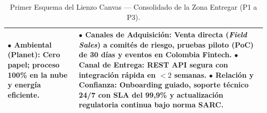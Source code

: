 \documentclass[11pt,a4paper]{article}
\begin{document}
\begin{table}[htbp]
\begin{tabularx}{\textwidth}{|X|X|}
$\bullet$ \textbf{Ambiental (Planet):} Cero papel; proceso 100\% en la nube y energ\'ia eficiente. & 
$\bullet$ \textbf{Canales de Adquisici\'on:} Venta directa (\textit{Field Sales}) a comit\'es de riesgo, pruebas piloto (PoC) de 30 d\'ias y eventos en Colombia Fintech. \newline
$\bullet$ \textbf{Canal de Entrega:} REST API segura con integraci\'on r\'apida en $<2$ semanas. \newline
$\bullet$ \textbf{Relaci\'on y Confianza:} Onboarding guiado, soporte t\'ecnico 24/7 con SLA del 99,9\% y actualizaci\'on regulatoria continua bajo norma SARC. \\
\hline
\end{tabularx}
\caption{Primer Esquema del Lienzo Canvas --- Consolidado de la Zona Entregar (P1 a P3).}
\end{table}
\end{document}
